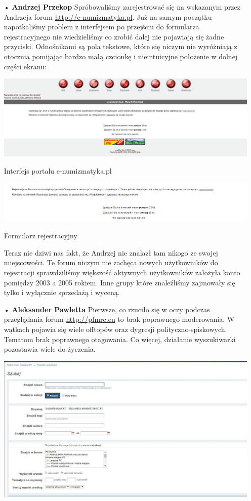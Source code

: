 \documentclass{article}
\begin{document}
\begin{enumerate}
\item[•]\textbf{Andrzej Przekop}\newline
Spróbowaliśmy zarejestrować się na wskazanym przez Andrzeja forum \url{ http://e-numizmatyka.pl}. Już na samym początku napotkaliśmy problem z interfejsem po przejściu do formularza rejestracyjnego nie wiedzieliśmy co zrobić dalej nie pojawiają się żadne przyciski. Odnośnikami są pola tekstowe, które się niczym nie wyróżniają z otocznia pomijając bardzo małą czcionkę i nieintuicyjne położenie w dolnej części ekranu:\newline
\begin{center}
\includegraphics[width=\textwidth]{kck1}
\caption{Interfejs portalu e-numizmatyka.pl}
\end{center}
\begin{center}
\includegraphics[width=\textwidth]{kck2}
\caption{Formularz rejestracyjny}
\end{center}
Teraz nie dziwi nas fakt, że Andrzej nie znalazł tam nikogo ze swojej miejscowości. Te forum niczym nie zachęca nowych użytkowników do rejestracji sprawdziliśmy większość aktywnych użytkowników założyła konto pomiędzy 2003 a 2005 rokiem. Inne grupy które znaleźliśmy zajmowały się tylko i wyłącznie sprzedażą i wyceną.
\item[•]\textbf{Aleksander Pawletta}\newline
Pierwsze, co rzuciło się w oczy podczas przeglądania forum \url{http://pfmrc.eu} to brak poprawnego moderowania. W wątkach pojawia się wiele offtopów oraz dygresji polityczno-spiskowych. Tematom brak poprawnego otagowania. Co więcej, działanie wyszukiwarki pozostawia wiele do życzenia.
\begin{center}
\includegraphics[width=\textwidth]{1}

\end{center}
\end{enumerate}
\end{document}
